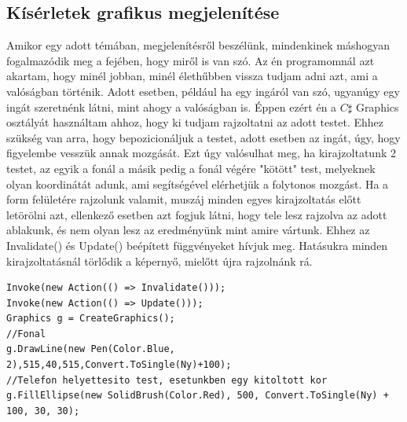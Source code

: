 \documentclass{thesis-ekf}
\theoremstyle{definition}
\theoremstyle{remark}
\begin{document}
\subsection{Kísérletek grafikus megjelenítése}
Amikor egy adott témában, megjelenítésről beszélünk, mindenkinek máshogyan fogalmazódik meg a fejében, hogy miről is van szó. Az én programomnál azt akartam, hogy minél jobban, minél élethűbben vissza tudjam adni azt, ami a valóságban történik. Adott esetben, például ha egy ingáról van szó, ugyanúgy egy ingát szeretnénk látni, mint ahogy a valóságban is. Éppen ezért én a $C\sharp$ Graphics osztályát használtam ahhoz, hogy ki tudjam rajzoltatni az adott testet. Ehhez szükség van arra, hogy bepozicionáljuk a testet, adott esetben az ingát, úgy, hogy figyelembe vesszük annak mozgását. Ezt úgy valósulhat meg, ha kirajzoltatunk 2 testet, az egyik a fonál a másik pedig a fonál végére "kötött" test, melyeknek olyan koordinátát adunk, ami segítségével elérhetjük a folytonos mozgást. Ha a form felületére rajzolunk valamit, muszáj minden egyes kirajzoltatás előtt letörölni azt, ellenkező esetben azt fogjuk látni, hogy tele lesz rajzolva az adott ablakunk, és nem olyan lesz az eredményünk mint amire vártunk. Ehhez az Invalidate() és Update() beépített függvényeket hívjuk meg. Hatásukra minden kirajzoltatásnál törlődik a képernyő, mielőtt újra rajzolnánk rá.
\begin{lstlisting}
Invoke(new Action(() => Invalidate()));
Invoke(new Action(() => Update()));
Graphics g = CreateGraphics();
//Fonal
g.DrawLine(new Pen(Color.Blue, 2),515,40,515,Convert.ToSingle(Ny)+100);
//Telefon helyettesito test, esetunkben egy kitoltott kor
g.FillEllipse(new SolidBrush(Color.Red), 500, Convert.ToSingle(Ny) + 100, 30, 30);
\end{lstlisting}
\end{document}
